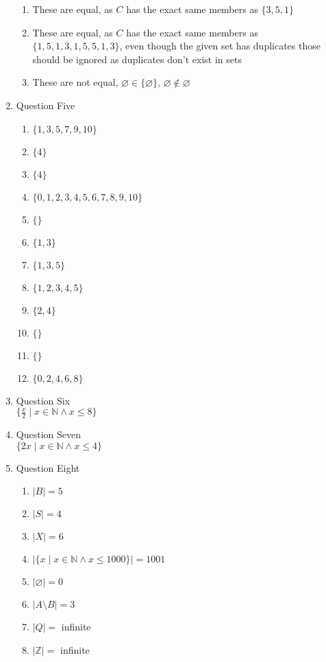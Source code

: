 \documentclass{article}
\begin{document}
\begin{enumerate}
\begin{enumerate}
        \item These are equal, as $C$ has the exact same members as $\{3, 5, 1\}$
        \item These are equal, as $C$ has the exact same members as $\{1, 5, 1, 3, 1, 5, 5, 1, 3\}$, even though the given set has duplicates those should be ignored as duplicates don't exist in sets
        \item These are not equal, $\varnothing \in \{\varnothing\}$, $\varnothing \notin \varnothing$
    \end{enumerate}
    \item Question Five
    \begin{enumerate}
        \item $\{1, 3, 5, 7, 9, 10\}$
        \item $\{4\}$
        \item $\{4\}$
        \item $\{0, 1, 2, 3, 4, 5, 6, 7, 8, 9, 10\}$
        \item $\{\}$
        \item $\{1, 3\}$
        \item $\{1, 3, 5\}$
        \item $\{1, 2, 3, 4, 5\}$
        \item $\{2, 4\}$
        \item $\{\}$
        \item $\{\}$
        \item $\{0, 2, 4, 6, 8\}$
    \end{enumerate}
    \item Question Six \\
    $\{\frac{x}{2} \mid x \in \mathbb{N} \land x \leq 8\}$
    \item Question Seven \\
    $\{2x \mid x \in \mathbb{N} \land x \leq 4\}$
    \item Question Eight
    \begin{enumerate}
        \item $| B | = 5$
        \item $| S | = 4$
        \item $| X | = 6$
        \item $| \{x \mid x \in \mathbb{N} \land x \leq 1000\} | = 1001$
        \item $| \varnothing | = 0$
        \item $| A \setminus B | = 3$
        \item $| Q | =$ infinite
        \item $| \mathbb{Z} | =$ infinite

\end{enumerate}
\end{enumerate}
\end{document}
